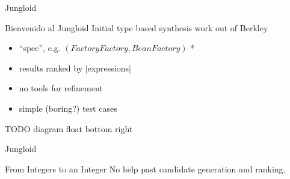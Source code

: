 \begin{frame}{Jungloid}
  \begin{block}{Bienvenido al Jungloid}
    Initial type based synthesis work out of Berkley

    \begin{itemize}
      \item ``spec'', e.g. $(FactoryFactory, BeanFactory)$ *
      \item results ranked by $|$expressions$|$
      \item no tools for refinement
      \item simple (boring?) test cases
    \end{itemize}

    TODO diagram float bottom right
  \end{block}
\end{frame}

\begin{frame}{Jungloid}
  \begin{block}{From Integers to an Integer}
    No help past candidate generation and ranking.

    \begin{example}
      
    \end{example}
  \end{block}
\end{frame}
